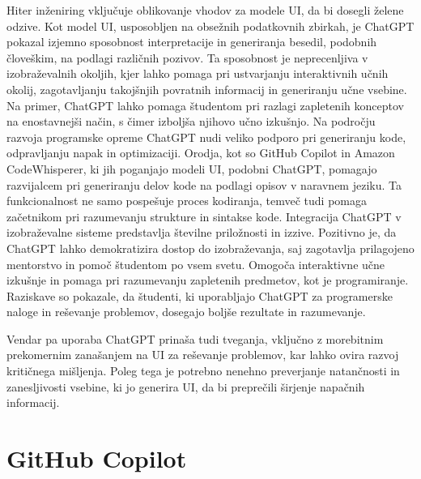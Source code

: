 \documentclass[a4paper,12pt,openright]{book}
\begin{document}
Hiter inženiring vključuje oblikovanje vhodov za modele UI, da bi dosegli želene odzive. Kot model UI, usposobljen na obsežnih podatkovnih zbirkah, je ChatGPT pokazal izjemno sposobnost interpretacije in generiranja besedil, podobnih človeškim, na podlagi različnih pozivov. Ta sposobnost je neprecenljiva v izobraževalnih okoljih, kjer lahko pomaga pri ustvarjanju interaktivnih učnih okolij, zagotavljanju takojšnjih povratnih informacij in generiranju učne vsebine. Na primer, ChatGPT lahko pomaga študentom pri razlagi zapletenih konceptov na enostavnejši način, s čimer izboljša njihovo učno izkušnjo.
Na področju razvoja programske opreme ChatGPT nudi veliko podporo pri generiranju kode, odpravljanju napak in optimizaciji. Orodja, kot so GitHub Copilot in Amazon CodeWhisperer, ki jih poganjajo modeli UI, podobni ChatGPT, pomagajo razvijalcem pri generiranju delov kode na podlagi opisov v naravnem jeziku. Ta funkcionalnost ne samo pospešuje proces kodiranja, temveč tudi pomaga začetnikom pri razumevanju strukture in sintakse kode.
Integracija ChatGPT v izobraževalne sisteme predstavlja številne priložnosti in izzive. Pozitivno je, da ChatGPT lahko demokratizira dostop do izobraževanja, saj zagotavlja prilagojeno mentorstvo in pomoč študentom po vsem svetu. Omogoča interaktivne učne izkušnje in pomaga pri razumevanju zapletenih predmetov, kot je programiranje. Raziskave so pokazale, da študenti, ki uporabljajo ChatGPT za programerske naloge in reševanje problemov, dosegajo boljše rezultate in razumevanje.

Vendar pa uporaba ChatGPT prinaša tudi tveganja, vključno z morebitnim prekomernim zanašanjem na UI za reševanje problemov, kar lahko ovira razvoj kritičnega mišljenja. Poleg tega je potrebno nenehno preverjanje natančnosti in zanesljivosti vsebine, ki jo generira UI, da bi preprečili širjenje napačnih informacij.
\cite{app13095783}
\section{GitHub Copilot}
\end{document}
